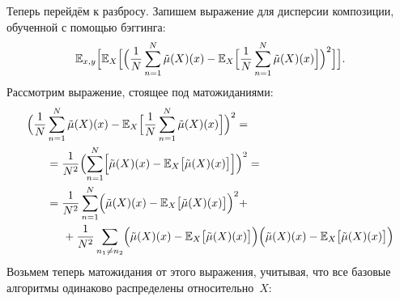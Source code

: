 \documentclass[12pt,fleqn]{article}
\begin{document}
Теперь перейдём к разбросу.
Запишем выражение для дисперсии композиции,
обученной с помощью бэггинга:
\[
    \mathbb{E}_{x, y} \Bigl[
        \mathbb{E}_{X} \Bigl[
            \Bigl(
                \frac{1}{N}
                \sum_{n = 1}^{N}
                    \tilde \mu(X)(x)
                -
                \mathbb{E}_{X} \Bigl[
                    \frac{1}{N}
                    \sum_{n = 1}^{N}
                        \tilde \mu(X)(x)
                \Bigr]
            \Bigr)^2
        \Bigr]
    \Bigr].
\]
Рассмотрим выражение, стоящее под матожиданиями:
\begin{align*}
    \Bigl(
        \frac{1}{N}&
        \sum_{n = 1}^{N}
            \tilde \mu(X)(x)
        -
        \mathbb{E}_{X} \Bigl[
            \frac{1}{N}
            \sum_{n = 1}^{N}
                \tilde \mu(X)(x)
        \Bigr]
    \Bigr)^2
    =\\
    &=
    \frac{1}{N^2}
    \Bigl(
        \sum_{n = 1}^{N} \Bigl[
                \tilde \mu(X)(x)
                -
                \mathbb{E}_{X} \bigl[
                    \tilde \mu(X)(x)
                \bigr]
        \Bigr]
    \Bigr)^2
    =\\
    &=
    \frac{1}{N^2}
    \sum_{n = 1}^{N} \Bigl(
        \tilde \mu(X)(x)
        -
        \mathbb{E}_{X} \bigl[
            \tilde \mu(X)(x)
        \bigr]
    \Bigr)^2 +\\
    &\text{\hspace{0.5cm}}+
    \frac{1}{N^2}
    \sum_{n_1 \neq n_2} \Bigl(
        \tilde \mu(X)(x)
        -
        \mathbb{E}_{X} \bigl[
            \tilde \mu(X)(x)
        \bigr]
    \Bigr)
    \Bigl(
        \tilde \mu(X)(x)
        -
        \mathbb{E}_{X} \bigl[
            \tilde \mu(X)(x)
        \bigr]
    \Bigr)
\end{align*}
Возьмем теперь матожидания от этого выражения, учитывая, что все базовые
алгоритмы одинаково распределены относительно~$X$:
\end{document}
